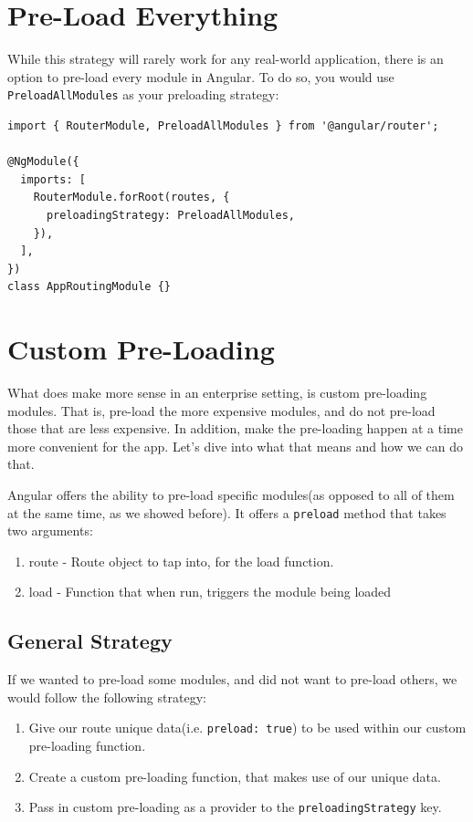 \section{Pre-Load Everything}
While this strategy will rarely work for any real-world application, there is 
an option to pre-load every module in Angular. To do so, you would use \lstinline{PreloadAllModules}
as your preloading strategy: 
\begin{lstlisting}
import { RouterModule, PreloadAllModules } from '@angular/router';

@NgModule({
  imports: [
    RouterModule.forRoot(routes, {
      preloadingStrategy: PreloadAllModules,
    }),
  ],
})
class AppRoutingModule {}
\end{lstlisting}

\section{ Custom Pre-Loading }
What does make more sense in an enterprise setting, is custom pre-loading
modules. That is, pre-load the more expensive modules, and do not pre-load those
that are less expensive. In addition, make the pre-loading happen at a time more 
convenient for the app. Let's dive into what that means and how we can do that.

Angular offers the ability to pre-load specific modules(as opposed to all of them 
at the same time, as we showed before). It offers a \lstinline{preload}
method that takes two arguments: 
\begin{enumerate}
  \item route - Route object to tap into, for the load function.
  \item load - Function that when run, triggers the module being loaded
\end{enumerate}

\subsection{General Strategy}
If we wanted to pre-load some modules, and did not want to pre-load others, we
would follow the following strategy:
\begin{enumerate}
  \item Give our route unique data(i.e. \lstinline{preload: true})
   to be used within our custom pre-loading function.
  \item Create a custom pre-loading function, that makes use of our unique data. 
  \item Pass in custom pre-loading as a provider to the \lstinline{preloadingStrategy} 
  key.
\end{enumerate}

